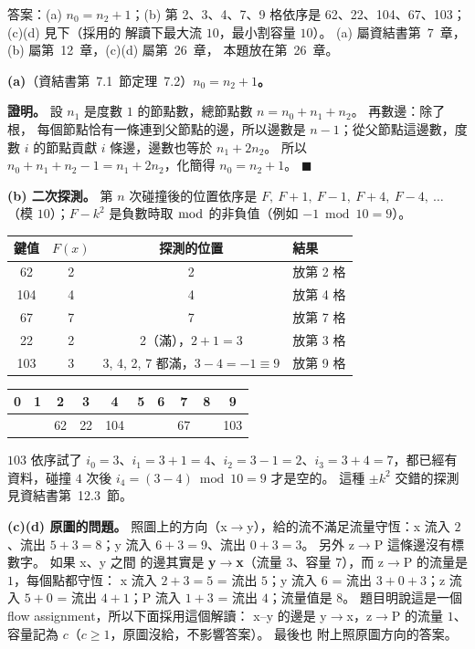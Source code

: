 \begin{pastsoln}
答案：(a) $n_0 = n_2 + 1$；(b) 第 2、3、4、7、9 格依序是 62、22、104、67、103；(c)(d) 見下（採用的
解讀下最大流 $10$，最小割容量 $10$）。 (a) 屬資結書第~7~章，(b) 屬第~12~章，(c)(d) 屬第~26~章，
本題放在第~26~章。

\textbf{(a)}（資結書第~7.1~節定理~7.2）\textbf{$n_0 = n_2 + 1$。}

\textbf{證明。} 設 $n_1$ 是度數 $1$ 的節點數，總節點數 $n = n_0 + n_1 + n_2$。 再數邊：除了根，
每個節點恰有一條連到父節點的邊，所以邊數是 $n - 1$；從父節點這邊數，度數 $i$ 的節點貢獻 $i$
條邊，邊數也等於 $n_1 + 2n_2$。 所以 $n_0 + n_1 + n_2 - 1 = n_1 + 2n_2$，化簡得
$n_0 = n_2 + 1$。 \hfill$\blacksquare$

\textbf{(b) 二次探測。} 第 $n$ 次碰撞後的位置依序是 $F,\ F + 1,\ F - 1,\ F + 4,\ F - 4,\ \ldots$
（模 $10$）；$F - k^2$ 是負數時取 $\bmod$ 的非負值（例如 $-1 \bmod 10 = 9$）。
\begin{center}
\begin{tabular}{cccl}
\toprule
鍵值 & $F(x)$ & 探測的位置 & 結果 \\
\midrule
62 & 2 & 2 & 放第 2 格 \\
104 & 4 & 4 & 放第 4 格 \\
67 & 7 & 7 & 放第 7 格 \\
22 & 2 & 2（滿），$2 + 1 = 3$ & 放第 3 格 \\
103 & 3 & 3, 4, 2, 7 都滿，$3 - 4 = -1 \equiv 9$ & 放第 9 格 \\
\bottomrule
\end{tabular}
\end{center}
\begin{center}
\begin{tabular}{|c|c|c|c|c|c|c|c|c|c|}
\multicolumn{1}{c}{0} & \multicolumn{1}{c}{1} & \multicolumn{1}{c}{2} & \multicolumn{1}{c}{3} &
\multicolumn{1}{c}{4} & \multicolumn{1}{c}{5} & \multicolumn{1}{c}{6} & \multicolumn{1}{c}{7} &
\multicolumn{1}{c}{8} & \multicolumn{1}{c}{9}\\ \hline
\phantom{00} & \phantom{00} & 62 & 22 & 104 & \phantom{00} & \phantom{00} & 67 & \phantom{00} & 103\\ \hline
\end{tabular}
\end{center}
$103$ 依序試了 $i_0 = 3$、$i_1 = 3 + 1 = 4$、$i_2 = 3 - 1 = 2$、$i_3 = 3 + 4 = 7$，都已經有資料，碰撞
$4$ 次後 $i_4 = (3 - 4) \bmod 10 = 9$ 才是空的。 這種 $\pm k^2$ 交錯的探測見資結書第~12.3~節。

\textbf{(c)(d) 原圖的問題。} 照圖上的方向（x$\to$y），給的流不滿足流量守恆：x 流入 $2$、流出
$5 + 3 = 8$；y 流入 $6 + 3 = 9$、流出 $0 + 3 = 3$。 另外 z$\to$P 這條邊沒有標數字。 如果 x、y 之間
的邊其實是 \textbf{y$\to$x}（流量 $3$、容量 $7$），而 z$\to$P 的流量是 $1$，每個點都守恆：
x 流入 $2 + 3 = 5$ = 流出 $5$；y 流入 $6$ = 流出 $3 + 0 + 3$；z 流入 $5 + 0$ = 流出 $4 + 1$；P 流入
$1 + 3$ = 流出 $4$；流量值是 $8$。 題目明說這是一個 flow assignment，所以下面採用這個解讀：
x--y 的邊是 y$\to$x，z$\to$P 的流量 $1$、容量記為 $c$（$c \ge 1$，原圖沒給，不影響答案）。 最後也
附上照原圖方向的答案。


\end{pastsoln}
